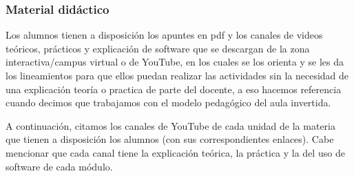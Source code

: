 \documentclass[oneside,spanish]{amsart}
\numberwithin{equation}{section}
\numberwithin{figure}{section}
\theoremstyle{definition}
\begin{document}
\subsubsection{Material didáctico}

Los alumnos tienen a disposición los apuntes en pdf y los canales de videos teóricos, prácticos y explicación de software que se descargan de la zona interactiva/campus virtual o de YouTube, en los cuales se los orienta y se les da los lineamientos para que ellos puedan realizar las actividades sin la necesidad de una explicación teoría o practica de parte del docente, a eso hacemos referencia cuando decimos que trabajamos con el modelo pedagógico del aula invertida.

A continuación, citamos los canales de YouTube de cada unidad de la materia que tienen a disposición los alumnos (con sus correspondientes enlaces). 
Cabe mencionar que cada canal tiene la explicación teórica, la práctica y la del uso de software de cada módulo.
\end{document}
